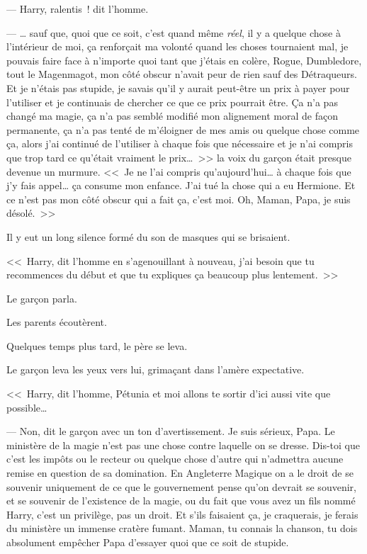 --- Harry, ralentis~! dit l'homme.

--- … sauf que, quoi que ce soit, c'est quand même \emph{réel}, il y a quelque chose à l'intérieur de moi, ça renforçait ma volonté quand les choses tournaient mal, je pouvais faire face à n'importe quoi tant que j'étais en colère, Rogue, Dumbledore, tout le Magenmagot, mon côté obscur n'avait peur de rien sauf des Détraqueurs. Et je n'étais pas stupide, je savais qu'il y aurait peut-être un prix à payer pour l'utiliser et je continuais de chercher ce que ce prix pourrait être. Ça n'a pas changé ma magie, ça n'a pas semblé modifié mon alignement moral de façon permanente, ça n'a pas tenté de m'éloigner de mes amis ou quelque chose comme ça, alors j'ai continué de l'utiliser à chaque fois que nécessaire et je n'ai compris que trop tard ce qu'était vraiment le prix…~>> la voix du garçon était presque devenue un murmure. <<~Je ne l'ai compris qu'aujourd'hui… à chaque fois que j'y fais appel… ça consume mon enfance. J'ai tué la chose qui a eu Hermione. Et ce n'est pas mon côté obscur qui a fait ça, c'est moi. Oh, Maman, Papa, je suis désolé.~>>

Il y eut un long silence formé du son de masques qui se brisaient.

<<~Harry, dit l'homme en s'agenouillant à nouveau, j'ai besoin que tu recommences du début et que tu expliques ça beaucoup plus lentement.~>>

Le garçon parla.

Les parents écoutèrent.

Quelques temps plus tard, le père se leva.

Le garçon leva les yeux vers lui, grimaçant dans l'amère expectative.

<<~Harry, dit l'homme, Pétunia et moi allons te sortir d'ici aussi vite que possible…

--- Non, dit le garçon avec un ton d'avertissement. Je suis sérieux, Papa. Le ministère de la magie n'est pas une chose contre laquelle on se dresse. Dis-toi que c'est les impôts ou le recteur ou quelque chose d'autre qui n'admettra aucune remise en question de sa domination. En Angleterre Magique on a le droit de se souvenir uniquement de ce que le gouvernement pense qu'on devrait se souvenir, et se souvenir de l'existence de la magie, ou du fait que vous avez un fils nommé Harry, c'est un privilège, pas un droit. Et s'ils faisaient ça, je craquerais, je ferais du ministère un immense cratère fumant. Maman, tu connais la chanson, tu dois absolument empêcher Papa d'essayer quoi que ce soit de stupide.

